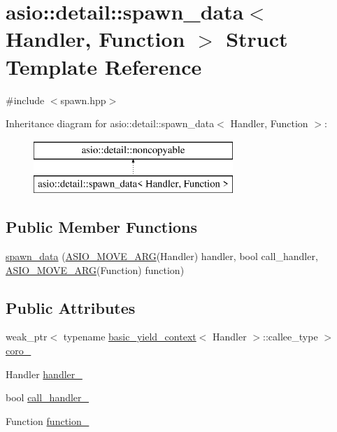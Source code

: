 \hypertarget{structasio_1_1detail_1_1spawn__data}{}\section{asio\+:\+:detail\+:\+:spawn\+\_\+data$<$ Handler, Function $>$ Struct Template Reference}
\label{structasio_1_1detail_1_1spawn__data}


{\ttfamily \#include $<$spawn.\+hpp$>$}

Inheritance diagram for asio\+:\+:detail\+:\+:spawn\+\_\+data$<$ Handler, Function $>$\+:\begin{figure}[H]
\begin{center}
\leavevmode
\includegraphics[height=2.000000cm]{structasio_1_1detail_1_1spawn__data}
\end{center}
\end{figure}
\subsection*{Public Member Functions}
\begin{DoxyCompactItemize}
\item 
\hyperlink{structasio_1_1detail_1_1spawn__data_a2b3cea5dc331b9c858483cbbf291cebd}{spawn\+\_\+data} (\hyperlink{group__async__read_ga6d72a97784dde9476c6d93b8904a4967}{A\+S\+I\+O\+\_\+\+M\+O\+V\+E\+\_\+\+A\+R\+G}(Handler) handler, bool call\+\_\+handler, \hyperlink{group__async__read_ga6d72a97784dde9476c6d93b8904a4967}{A\+S\+I\+O\+\_\+\+M\+O\+V\+E\+\_\+\+A\+R\+G}(Function) function)
\end{DoxyCompactItemize}
\subsection*{Public Attributes}
\begin{DoxyCompactItemize}
\item 
weak\+\_\+ptr$<$ typename \hyperlink{classasio_1_1basic__yield__context}{basic\+\_\+yield\+\_\+context}$<$ Handler $>$\+::callee\+\_\+type $>$ \hyperlink{structasio_1_1detail_1_1spawn__data_a3d0b86a01a51c2dd0a92cf4dfedd4ce0}{coro\+\_\+}
\item 
Handler \hyperlink{structasio_1_1detail_1_1spawn__data_a9450f8cd517de26ccb775cdd8f0254e9}{handler\+\_\+}
\item 
bool \hyperlink{structasio_1_1detail_1_1spawn__data_abb8049886da1a441474507f6790c3f14}{call\+\_\+handler\+\_\+}
\item 
Function \hyperlink{structasio_1_1detail_1_1spawn__data_ab2f73b1edf9593c3f9eb72c80d5446a2}{function\+\_\+}
\end{DoxyCompactItemize}



